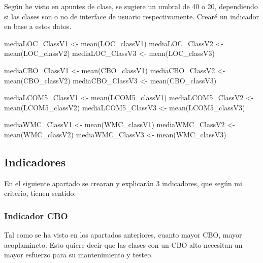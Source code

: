 \documentclass[
]{article}
\newenvironment{Shaded}{\begin{snugshade}}{\end{snugshade}}
\newcommand{\FunctionTok}[1]{\textcolor[rgb]{0.00,0.00,0.00}{#1}}
\newcommand{\NormalTok}[1]{#1}
\newcommand{\OtherTok}[1]{\textcolor[rgb]{0.56,0.35,0.01}{#1}}
\begin{document}
Según he visto en apuntes de clase, se sugiere un umbral de 40 o 20,
dependiendo si las clases son o no de interface de usuario
respectivamente. Crearé un indicador en base a estos datos.

\begin{Shaded}
\begin{Highlighting}[]
\NormalTok{mediaLOC\_ClassV1 }\OtherTok{\textless{}{-}} \FunctionTok{mean}\NormalTok{(LOC\_classV1)}
\NormalTok{mediaLOC\_ClassV2 }\OtherTok{\textless{}{-}} \FunctionTok{mean}\NormalTok{(LOC\_classV2)}
\NormalTok{mediaLOC\_ClassV3 }\OtherTok{\textless{}{-}} \FunctionTok{mean}\NormalTok{(LOC\_classV3)}

\NormalTok{mediaCBO\_ClassV1 }\OtherTok{\textless{}{-}} \FunctionTok{mean}\NormalTok{(CBO\_classV1)}
\NormalTok{mediaCBO\_ClassV2 }\OtherTok{\textless{}{-}} \FunctionTok{mean}\NormalTok{(CBO\_classV2)}
\NormalTok{mediaCBO\_ClassV3 }\OtherTok{\textless{}{-}} \FunctionTok{mean}\NormalTok{(CBO\_classV3)}

\NormalTok{mediaLCOM5\_ClassV1 }\OtherTok{\textless{}{-}} \FunctionTok{mean}\NormalTok{(LCOM5\_classV1)}
\NormalTok{mediaLCOM5\_ClassV2 }\OtherTok{\textless{}{-}} \FunctionTok{mean}\NormalTok{(LCOM5\_classV2)}
\NormalTok{mediaLCOM5\_ClassV3 }\OtherTok{\textless{}{-}} \FunctionTok{mean}\NormalTok{(LCOM5\_classV3)}

\NormalTok{mediaWMC\_ClassV1 }\OtherTok{\textless{}{-}} \FunctionTok{mean}\NormalTok{(WMC\_classV1)}
\NormalTok{mediaWMC\_ClassV2 }\OtherTok{\textless{}{-}} \FunctionTok{mean}\NormalTok{(WMC\_classV2)}
\NormalTok{mediaWMC\_ClassV3 }\OtherTok{\textless{}{-}} \FunctionTok{mean}\NormalTok{(WMC\_classV3)}
\end{Highlighting}
\end{Shaded}

\hypertarget{indicadores}{%
\subsection{Indicadores}\label{indicadores}}

En el siguiente apartado se crearan y explicarán 3 indicadores, que
según mi criterio, tienen sentido.

\hypertarget{indicador-cbo}{%
\subsubsection{Indicador CBO}\label{indicador-cbo}}

Tal como se ha visto en los apartados anteriores, cuanto mayor CBO,
mayor acoplamineto. Esto quiere decir que las clases con un CBO alto
necesitan un mayor esfuerzo para su mantenimiento y testeo.
\end{document}
